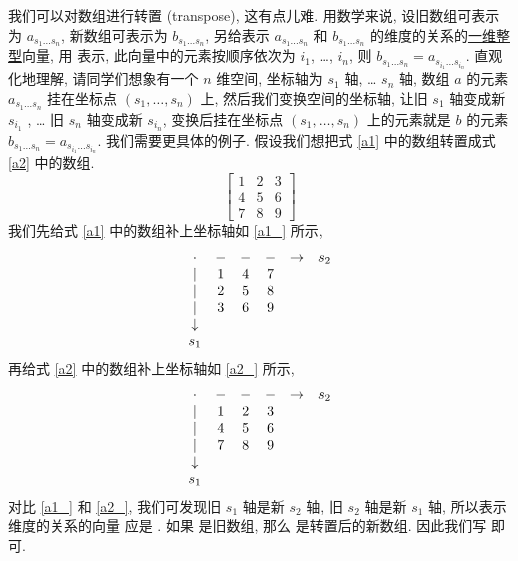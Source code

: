 我们可以对数组进行转置 (transpose), 这有点儿难. 用数学来说, 设旧数组可表示为 $a_{s_1\dots s_n}$, 新数组可表示为 $b_{s_1\dots s_n}$, 另给表示 $a_{s_1\dots s_n}$ 和 $b_{s_1\dots s_n}$ 的维度的关系的\uline{一维整型}向量, 用  表示, 此向量中的元素按顺序依次为 $i_1$, \dots{}, $i_n$, 则 $b_{s_1\dots s_n}=a_{s_{i_1}\dots s_{i_n}}$. 直观化地理解, 请同学们想象有一个 $n$ 维空间, 坐标轴为 $s_1$ 轴, \dots{} $s_n$ 轴, 数组 $a$ 的元素 $a_{s_1\dots s_n}$ 挂在坐标点 $(s_1,\dots,s_n)$ 上, 然后我们变换空间的坐标轴, 让旧 $s_1$ 轴变成新 $s_{i_1}$ , \dots{} 旧 $s_n$ 轴变成新 $s_{i_n}$, 变换后挂在坐标点 $(s_1,\dots,s_n)$ 上的元素就是 $b$ 的元素 $b_{s_1\dots s_n}=a_{s_{i_1}\dots s_{i_n}}$. 我们需要更具体的例子. 假设我们想把式 \eqref{a1} 中的数组转置成式 \eqref{a2} 中的数组.
\begin{equation}
    \begin{bmatrix}
        1&2&3\\
        4&5&6\\
        7&8&9
    \end{bmatrix}\label{a2}
\end{equation}
我们先给式 \eqref{a1} 中的数组补上坐标轴如 \eqref{a1_} 所示,
\begin{equation}
    \begin{matrix}
        \cdot&-&-&-&\rightarrow&s_2\\
        |&1&4&7&&\\
        |&2&5&8&&\\
        |&3&6&9&&\\
        \downarrow&&&&&\\
        s_1&&&&&\\
    \end{matrix}\label{a1_}
\end{equation}
再给式 \eqref{a2} 中的数组补上坐标轴如 \eqref{a2_} 所示,
\begin{equation}
    \begin{matrix}
        \cdot&-&-&-&\rightarrow&s_2\\
        |&1&2&3&&\\
        |&4&5&6&&\\
        |&7&8&9&&\\
        \downarrow&&&&&\\
        s_1&&&&&\\
    \end{matrix}\label{a2_}
\end{equation}
对比 \eqref{a1_} 和 \eqref{a2_}, 我们可发现旧 $s_1$ 轴是新 $s_2$ 轴, 旧 $s_2$ 轴是新 $s_1$ 轴, 所以表示维度的关系的向量  应是 \ttt{[2, 1]}. 如果  是旧数组, 那么  是转置后的新数组. 因此我们写  即可.

